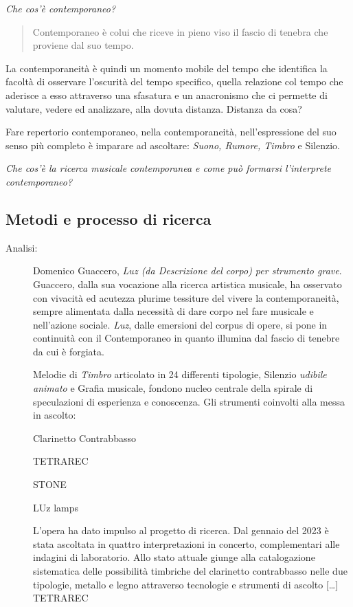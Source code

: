 \documentclass{gs-adonis}
\begin{document}
\emph{Che cos'è contemporaneo?}

\begin{quote}
  Contemporaneo è colui che riceve in pieno viso il fascio di tenebra che proviene dal suo tempo. \cite{agamben2008che}
\end{quote}

La contemporaneità è quindi un momento mobile del tempo che identifica la
facoltà di osservare l’oscurità del tempo specifico, quella relazione col
tempo che aderisce a esso attraverso una sfasatura e un anacronismo che ci
permette di valutare, vedere ed analizzare, alla dovuta distanza. Distanza da
cosa?

Fare repertorio contemporaneo, nella contemporaneità, nell’espressione del suo
senso più completo è imparare ad ascoltare: \emph{Suono, Rumore, Timbro} e Silenzio.

\emph{Che cos'è la ricerca musicale contemporanea e come può formarsi l'interprete contemporaneo?}

\subsection{Metodi e processo di ricerca}%

\begin{description}
  \item[Analisi:] Domenico Guaccero, \emph{Luz (da Descrizione del corpo) per strumento grave}.
  Guaccero, dalla sua vocazione alla ricerca artistica musicale, ha osservato con vivacità
  ed acutezza plurime tessiture del vivere la contemporaneità, sempre alimentata
  dalla necessità di dare corpo nel fare musicale e nell'azione sociale.
  \emph{Luz}, dalle emersioni del corpus di opere, si pone in continuità con
  il Contemporaneo in quanto illumina dal fascio di tenebre da cui è forgiata.

  Melodie di \emph{Timbro} articolato in 24 differenti tipologie, Silenzio
  \emph{udibile animato} e Grafia musicale, fondono nucleo centrale della spirale
  di speculazioni di esperienza e conoscenza.
  Gli strumenti coinvolti alla messa in ascolto:

  Clarinetto Contrabbasso

  TETRAREC

  STONE

  LUz lamps

  L'opera ha dato impulso al progetto di ricerca.
  Dal gennaio del 2023 è stata ascoltata in quattro interpretazioni in concerto,
  complementari alle indagini di laboratorio.
  Allo stato attuale giunge alla catalogazione sistematica delle possibilità
  timbriche del clarinetto contrabbasso nelle due tipologie, metallo e legno
  attraverso tecnologie e strumenti di ascolto [\ldots] TETRAREC %
\end{description}
\end{document}

